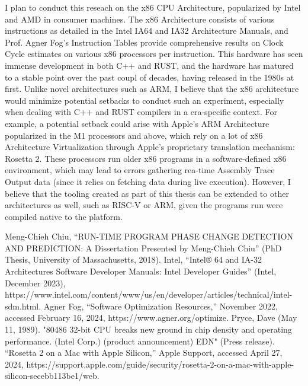 \documentclass[conference]{IEEEtran}
\begin{document}
I plan to conduct this reseach on the x86 CPU Architecture, popularized by Intel and AMD in consumer machines. The x86 Architecture consists of various instructions as detailed in the Intel IA64 and IA32 Architecture Manuals\cite{b2}, and Prof. Agner Fog's Instruction Tables provide comprehensive results on Clock Cycle estimates on various x86 processors per instruction\cite{b3}. This hardware has seen immense development in both C++ and RUST, and the hardware has matured to a stable point over the past coupl of decades, having released in the 1980s at first\cite{b4}. Unlike novel architectures such as ARM, I believe that the x86 architecture would minimize potential setbacks to conduct such an experiment, especially when dealing with C++ and RUST compilers in a era-specific context. For example, a potential setback could arise with Apple's ARM Architecture popularized in the M1 processors and above, which rely on a lot of x86 Architecture Virtualization through Apple's proprietary translation mechanism: Rosetta 2\cite{b5}. These processors run older x86 programs in a software-defined x86 environment, which may lead to errors gathering rea-time Assembly Trace Output data (since it relies on fetching data during live execution). However, I believe that the tooling created as part of this thesis can be extended to other architectures as well, such as RISC-V or ARM, given the programs run were compiled native to the platform. 

\begin{thebibliography}{00}
	 Meng-Chieh Chiu, “RUN-TIME PROGRAM PHASE CHANGE DETECTION AND PREDICTION: A Dissertation Presented by Meng-Chieh Chiu” (PhD Thesis, University of Massachusetts, 2018).
	 Intel, “Intel® 64 and IA-32 Architectures Software Developer Manuals: Intel Developer Guides” (Intel, December 2023), https://www.intel.com/content/www/us/en/developer/articles/technical/intel-sdm.html.
	 Agner Fog, “Software Optimization Resources,” November 2022, accessed February 16, 2024, https://www.agner.org/optimize.
	 Pryce, Dave (May 11, 1989). "80486 32-bit CPU breaks new ground in chip density and operating performance. (Intel Corp.) (product announcement) EDN" (Press release).
	 “Rosetta 2 on a Mac with Apple Silicon,” Apple Support, accessed April 27, 2024, https://support.apple.com/guide/security/rosetta-2-on-a-mac-with-apple-silicon-secebb113be1/web.
\end{thebibliography}
\end{document}
